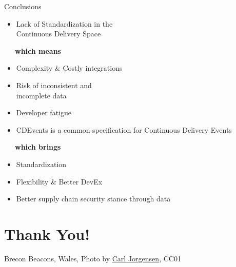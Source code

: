 \documentclass[aspectratio=169,11pt,hyperref={colorlinks=true}]{beamer}
\begin{document}
\begin{2columnsframe}{Conclusions}%
  {%
  \begin{itemize}
    \item Lack of Standardization in the\\
    Continuous Delivery Space
  \end{itemize}
  \vspace{0.22\textheight}
  ~~~\textbf{which means}
  \vspace{0.05\textheight}
  \begin{itemize}
    \item Complexity \& Costly integrations
    \item Risk of inconsistent and\\
          incomplete data
    \item Developer fatigue
  \end{itemize}
  }{%
  \begin{itemize}
    \item CDEvents is a common specification for Continuous Delivery Events
  \end{itemize}
  \vspace{0.22\textheight}
  ~~~\textbf{which brings}
  \vspace{0.05\textheight}
  \begin{itemize}
    \item Standardization
    \item Flexibility \& Better DevEx
    \item Better supply chain security stance through data
  \end{itemize}
  }
\end{2columnsframe}

\section[Thank You]{Thank You!}

\begin{sectionwithpiclargecentral}{Brecon Beacons, Wales, Photo by \href{https://unsplash.com/@scamartist}{\underline{Carl Jorgensen}}, CC0}{1}
\end{sectionwithpiclargecentral}
\end{document}
